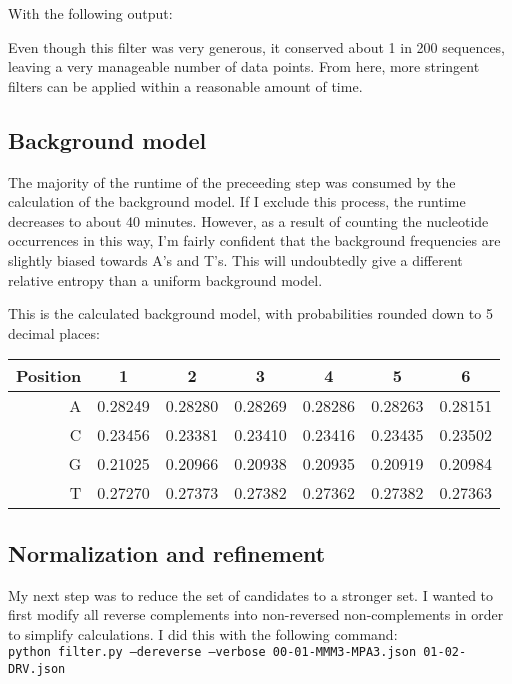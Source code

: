 \documentclass[a4paper, 12pt]{report}
\begin{document}
        With the following output:
        
        Even though this filter was very generous, it conserved about 1 in 200 sequences, 
            leaving a very manageable number of data points.  
        From here, more stringent filters can be applied within a reasonable amount of time.
        
    \subsection{Background model}
        The majority of the runtime of the preceeding step was consumed by the calculation of the background model.
        If I exclude this process, the runtime decreases to about 40 minutes. 
        However, as a result of counting the nucleotide occurrences in this way, 
            I'm fairly confident that the background frequencies are slightly biased towards A's and T's.
        This will undoubtedly give a different relative entropy than a uniform background model.  
        
        This is the calculated background model, with probabilities rounded down to 5 decimal places: \\
        \begin{tabular}{r*{6}{|c}}
            Position & 1 & 2 & 3 & 4 & 5 & 6 \\ \hline
            A & 0.28249 & 0.28280 & 0.28269 & 0.28286 & 0.28263 & 0.28151 \\ \hline
            C & 0.23456 & 0.23381 & 0.23410 & 0.23416 & 0.23435 & 0.23502 \\ \hline
            G & 0.21025 & 0.20966 & 0.20938 & 0.20935 & 0.20919 & 0.20984 \\ \hline
            T & 0.27270 & 0.27373 & 0.27382 & 0.27362 & 0.27382 & 0.27363
        \end{tabular}
    
    \subsection{Normalization and refinement}
        My next step was to reduce the set of candidates to a stronger set.  
        I wanted to first modify all reverse complements into non-reversed non-complements 
            in order to simplify calculations.  I did this with the following command: \\
        \texttt{python filter.py --dereverse --verbose 00-01-MMM3-MPA3.json 01-02-DRV.json}
            
\end{document}
